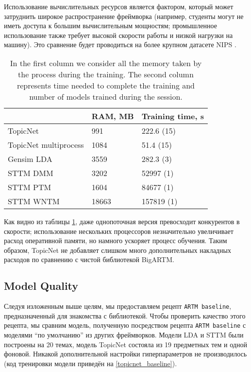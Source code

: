 Использование вычислительных ресурсов является фактором, который может затруднить широкое распространение фреймворка (например, студенты могут не иметь доступа к большим вычислительным мощностям; промышленное  использование также требует высокой скорости работы и низкой нагрузки на машину). Это сравнение будет проводиться на более крупном датасете NIPS \cite{mccallum1996bow}.  

\begin{table}[h]
\begin{tabular}{|l|l|l|}
\hline
                      & \multicolumn{1}{c|}{RAM, MB} & \multicolumn{1}{c|}{Training time, s} \\ \hline
TopicNet              & 991                         & 222.6 (15)                             \\ \hline
TopicNet multiprocess & 1084                        & 51.4 (15)                              \\ \hline
Gensim LDA            & 3559                        & 282.3 (3)                              \\ \hline
STTM DMM              & 3202                        & 52997 (1)                              \\ \hline
STTM PTM              & 1604                        & 84677 (1)                              \\ \hline
STTM WNTM             & 18663                       & 157819 (1)                             \\ \hline
\end{tabular}
\caption{In the first column we consider all the memory taken by the process during the training. The second column represents time needed to complete the training and number of models trained during the session.}
\label{performance-benchmark}
\end{table} 

Как видно из таблицы \ref{performance-benchmark}, даже однопоточная версия превосходит конкурентов в скорости; использование нескольких процессоров незначительно увеличивает расход оперативной памяти, но намного ускоряет процесс обучения. Таким образом, TopicNet не добавляет слишком много дополнительных накладных расходов по сравнению с чистой библиотекой BigARTM.  

\subsection{Model Quality} 

Следуя изложенным выше целям, мы предоставляем рецепт \texttt{ARTM baseline}, предназначенный для знакомства с библиотекой. Чтобы проверить качество этого рецепта, мы сравним модель, полученную посредством рецепта \texttt{ARTM baseline} с моделями ``по умолчанию'' из других фреймворков. Модели LDA и STTM были построены на 20 темах, модель TopicNet состояла из 19 предметных тем и одной фоновой. Никакой дополнительной настройки гиперпараметров не производилось (код тренировки модели приведён на \ref{topicnet_baseline}).  

